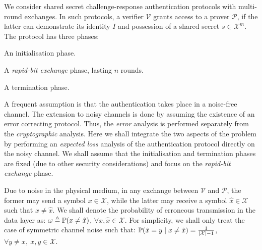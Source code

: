 \documentclass[a4paper]{article}
\newcommand \defn {\mathrel{\triangleq}}
\renewcommand\Pr{\mathop{\mbox{\ensuremath{\mathbb{P}}}}\nolimits}
\newcommand \noise {\omega}
\newcommand \CX {\mathcal{X}}
\newcommand \auth {\mathcal{P}}
\newcommand \ver {\mathcal{V}}
\newcommand \id {I}
\newcommand \rx {\hat{x}}
\theoremstyle{plain} \newtheorem{remark}{Remark}
\theoremstyle{plain} \newtheorem{definition}{Definition}
\theoremstyle{plain} \newtheorem{example}{Example}
\theoremstyle{plain} \newtheorem{assumption}{Assumption}
\theoremstyle{plain} \newtheorem{conjecture}{Conjecture}
\theoremstyle{plain} \newtheorem{theorem}{Theorem}
\theoremstyle{plain} \newtheorem{proposition}{Proposition}
\theoremstyle{plain} \newtheorem{lemma}{Lemma}
\theoremstyle{plain} \newtheorem{corollary}{Corollary}
\begin{document}
We consider shared secret challenge-response authentication protocols
with multi-round exchanges.  In such protocols, a verifier $\ver$
grants access to a prover $\auth$, if the latter can demonstrate its
identity $\id$ and possession of a shared secret $s \in \CX^m$. The
protocol has three phases:
\begin{inparaenum}[(i)]
\item An initialisation phase.
\item A \textit{rapid-bit exchange} phase, lasting $n$ rounds.
\item A termination phase.
\end{inparaenum}
A frequent assumption is that the authentication takes place in a
noise-free channel. The extension to noisy channels is done by
assuming the existence of an error correcting protocol. Thus, the {\em
  error} analysis is performed separately from the {\em cryptographic}
analysis. Here we shall integrate the two aspects of the problem by
performing an {\em expected loss} analysis of the authentication
protocol directly on the noisy channel. We shall assume that the
initialisation and termination phases are fixed (due to other security
considerations) and focus on the \textit{rapid-bit exchange} phase.

Due to noise in the physical medium, in any exchange between $\ver$
and $\auth$, the former may send a symbol $x \in \CX$, while the
latter may receive a symbol $\rx \in \CX$ such that $x \neq \rx$. We
shall denote the probability of erroneous transmission in the data
layer as: $\noise \defn \Pr(x \neq \rx)$, $\forall x, \rx \in \CX$.
For simplicity, we shall only treat the case of symmetric channel
noise such that: $\Pr(\rx = y \mid x \neq \rx) = \frac{1}{|\CX| - 1}$,
$\forall y \neq x, ~x,y \in \CX$.
\end{document}
